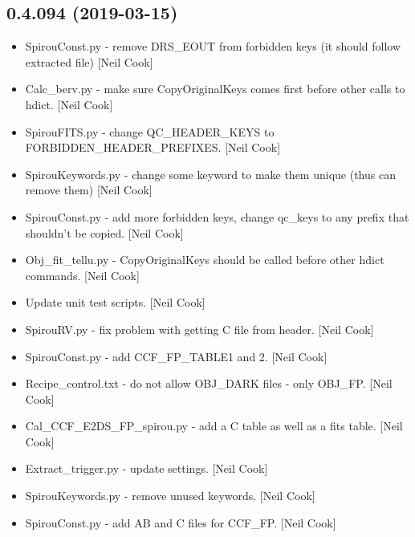 \documentclass[a4paper,10pt,english]{report}
\begin{document}
\subsection{0.4.094 (2019-03-15)}
\label{\detokenize{misc/changelog:id164}}\begin{itemize}
\item {} 
SpirouConst.py - remove DRS\_EOUT from forbidden keys (it should follow
extracted file) {[}Neil Cook{]}

\item {} 
Calc\_berv.py - make sure CopyOriginalKeys comes first before other
calls to hdict. {[}Neil Cook{]}

\item {} 
SpirouFITS.py - change QC\_HEADER\_KEYS to FORBIDDEN\_HEADER\_PREFIXES.
{[}Neil Cook{]}

\item {} 
SpirouKeywords.py - change some keyword to make them unique (thus can
remove them) {[}Neil Cook{]}

\item {} 
SpirouConst.py - add more forbidden keys, change qc\_keys to any prefix
that shouldn’t be copied. {[}Neil Cook{]}

\item {} 
Obj\_fit\_tellu.py - CopyOriginalKeys should be called before other
hdict commands. {[}Neil Cook{]}

\item {} 
Update unit test scripts. {[}Neil Cook{]}

\item {} 
SpirouRV.py - fix problem with getting C file from header. {[}Neil Cook{]}

\item {} 
SpirouConst.py - add CCF\_FP\_TABLE1 and 2. {[}Neil Cook{]}

\item {} 
Recipe\_control.txt - do not allow OBJ\_DARK files - only OBJ\_FP. {[}Neil
Cook{]}

\item {} 
Cal\_CCF\_E2DS\_FP\_spirou.py - add a C table as well as a fits table.
{[}Neil Cook{]}

\item {} 
Extract\_trigger.py - update settings. {[}Neil Cook{]}

\item {} 
SpirouKeywords.py - remove unused keywords. {[}Neil Cook{]}

\item {} 
SpirouConst.py - add AB and C files for CCF\_FP. {[}Neil Cook{]}


\end{itemize}
\end{document}
